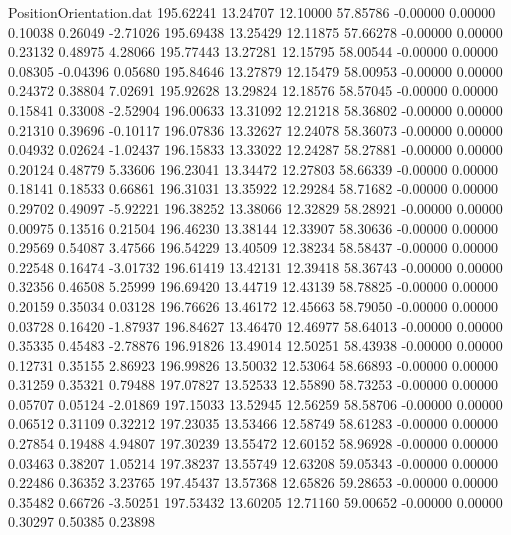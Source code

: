 \begin{filecontents}{PositionOrientation.dat}
 195.62241   13.24707   12.10000    57.85786   -0.00000    0.00000    0.10038    0.26049   -2.71026
 195.69438   13.25429   12.11875    57.66278   -0.00000    0.00000    0.23132    0.48975    4.28066
 195.77443   13.27281   12.15795    58.00544   -0.00000    0.00000    0.08305   -0.04396    0.05680
 195.84646   13.27879   12.15479    58.00953   -0.00000    0.00000    0.24372    0.38804    7.02691
 195.92628   13.29824   12.18576    58.57045   -0.00000    0.00000    0.15841    0.33008   -2.52904
 196.00633   13.31092   12.21218    58.36802   -0.00000    0.00000    0.21310    0.39696   -0.10117
 196.07836   13.32627   12.24078    58.36073   -0.00000    0.00000    0.04932    0.02624   -1.02437
 196.15833   13.33022   12.24287    58.27881   -0.00000    0.00000    0.20124    0.48779    5.33606
 196.23041   13.34472   12.27803    58.66339   -0.00000    0.00000    0.18141    0.18533    0.66861
 196.31031   13.35922   12.29284    58.71682   -0.00000    0.00000    0.29702    0.49097   -5.92221
 196.38252   13.38066   12.32829    58.28921   -0.00000    0.00000    0.00975    0.13516    0.21504
 196.46230   13.38144   12.33907    58.30636   -0.00000    0.00000    0.29569    0.54087    3.47566
 196.54229   13.40509   12.38234    58.58437   -0.00000    0.00000    0.22548    0.16474   -3.01732
 196.61419   13.42131   12.39418    58.36743   -0.00000    0.00000    0.32356    0.46508    5.25999
 196.69420   13.44719   12.43139    58.78825   -0.00000    0.00000    0.20159    0.35034    0.03128
 196.76626   13.46172   12.45663    58.79050   -0.00000    0.00000    0.03728    0.16420   -1.87937
 196.84627   13.46470   12.46977    58.64013   -0.00000    0.00000    0.35335    0.45483   -2.78876
 196.91826   13.49014   12.50251    58.43938   -0.00000    0.00000    0.12731    0.35155    2.86923
 196.99826   13.50032   12.53064    58.66893   -0.00000    0.00000    0.31259    0.35321    0.79488
 197.07827   13.52533   12.55890    58.73253   -0.00000    0.00000    0.05707    0.05124   -2.01869
 197.15033   13.52945   12.56259    58.58706   -0.00000    0.00000    0.06512    0.31109    0.32212
 197.23035   13.53466   12.58749    58.61283   -0.00000    0.00000    0.27854    0.19488    4.94807
 197.30239   13.55472   12.60152    58.96928   -0.00000    0.00000    0.03463    0.38207    1.05214
 197.38237   13.55749   12.63208    59.05343   -0.00000    0.00000    0.22486    0.36352    3.23765
 197.45437   13.57368   12.65826    59.28653   -0.00000    0.00000    0.35482    0.66726   -3.50251
 197.53432   13.60205   12.71160    59.00652   -0.00000    0.00000    0.30297    0.50385    0.23898

\end{filecontents}
